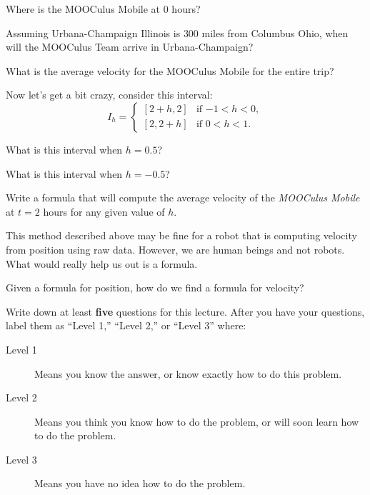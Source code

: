 \documentclass{ximera}
\begin{document}
\begin{question}
Where is the MOOCulus Mobile at $0$ hours? 
\end{question}


\begin{question}
Assuming Urbana-Champaign Illinois is $300$ miles from Columbus Ohio,
when will the MOOCulus Team arrive in Urbana-Champaign?
\end{question}

\begin{question}
What is the average velocity for the MOOCulus Mobile for the entire trip? 
\end{question}

Now let's get a bit crazy, consider this interval:
\[
I_h = 
\begin{cases}
[2+h,2]  & \text{if $-1<h<0$}, \\ %
[2,2+h]  & \text{if $0<h<1$}. 
\end{cases}
\]

\begin{question}
What is this interval when $h = 0.5$?
\end{question}

\begin{question}
What is this interval when $h = -0.5$?
\end{question}

\begin{question}
Write a formula that will compute the average velocity of the
\textit{MOOCulus Mobile} at $t=2$ hours for any given value of $h$.
\end{question}

This method described above may be fine for a robot that is computing
velocity from position using raw data. However, we are human beings
and not robots. What would really help us out is a formula. 



\begin{question}
Given a formula for position, how do we find a formula for velocity?
\end{question}

\begin{xarmaBoost}
Write down at least \textbf{five} questions for this lecture. After
you have your questions, label them as ``Level 1,'' ``Level 2,'' or ``Level 3'' where:
\begin{description}
\item[Level 1] Means you know the answer, or know exactly how to do
  this problem.
\item[Level 2] Means you think you know how to do the problem, or will
  soon learn how to do the problem.
\item[Level 3] Means you have no idea how to do the problem.
\end{description}
  \begin{freeResponse}
  \end{freeResponse}
\end{xarmaBoost}
\end{document}
